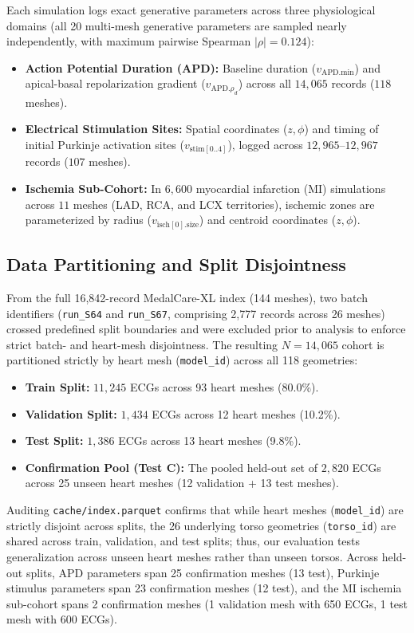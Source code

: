 \documentclass[10pt,twocolumn,letterpaper]{article}
\begin{document}
Each simulation logs exact generative parameters across three physiological domains (all 20 multi-mesh generative parameters are sampled nearly independently, with maximum pairwise Spearman $|\rho| = 0.124$):
\begin{itemize}
    \item \textbf{Action Potential Duration (APD):} Baseline duration ($v_{\text{APD.min}}$) and apical-basal repolarization gradient ($v_{\text{APD.}\rho_d}$) across all $14{,}065$ records ($118$ meshes).
    \item \textbf{Electrical Stimulation Sites:} Spatial coordinates ($z, \phi$) and timing of initial Purkinje activation sites ($v_{\text{stim}[0..4]}$), logged across $12{,}965\text{--}12{,}967$ records ($107$ meshes).
    \item \textbf{Ischemia Sub-Cohort:} In $6{,}600$ myocardial infarction (MI) simulations across $11$ meshes (LAD, RCA, and LCX territories), ischemic zones are parameterized by radius ($v_{\text{isch}[0].\text{size}}$) and centroid coordinates ($z, \phi$).
\end{itemize}

\subsection{Data Partitioning and Split Disjointness}
From the full 16,842-record MedalCare-XL index (144 meshes), two batch identifiers (\texttt{run\_S64} and \texttt{run\_S67}, comprising 2,777 records across 26 meshes) crossed predefined split boundaries and were excluded prior to analysis to enforce strict batch- and heart-mesh disjointness. The resulting $N = 14{,}065$ cohort is partitioned strictly by heart mesh (\texttt{model\_id}) across all 118 geometries:
\begin{itemize}
    \item \textbf{Train Split:} $11{,}245$ ECGs across 93 heart meshes (80.0\%).
    \item \textbf{Validation Split:} $1{,}434$ ECGs across 12 heart meshes (10.2\%).
    \item \textbf{Test Split:} $1{,}386$ ECGs across 13 heart meshes (9.8\%).
    \item \textbf{Confirmation Pool (Test C):} The pooled held-out set of $2{,}820$ ECGs across 25 unseen heart meshes (12 validation + 13 test meshes).
\end{itemize}
Auditing \texttt{cache/index.parquet} confirms that while heart meshes (\texttt{model\_id}) are strictly disjoint across splits, the 26 underlying torso geometries (\texttt{torso\_id}) are shared across train, validation, and test splits; thus, our evaluation tests generalization across unseen heart meshes rather than unseen torsos. Across held-out splits, APD parameters span 25 confirmation meshes (13 test), Purkinje stimulus parameters span 23 confirmation meshes (12 test), and the MI ischemia sub-cohort spans 2 confirmation meshes (1 validation mesh with 650 ECGs, 1 test mesh with 600 ECGs).
\end{document}
